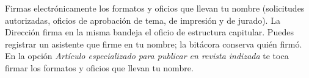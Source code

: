\documentclass[11pt,a4paper]{article}
\begin{document}
{\small\tableofcontents}
\newpage
\begin{quevasahacer}
Firmas electrónicamente los formatos y oficios que llevan tu nombre (solicitudes autorizadas, oficios de aprobación de tema, de impresión y de jurado). La Dirección firma en la misma bandeja el oficio de estructura capitular. Puedes registrar un asistente que firme en tu nombre; la bitácora conserva quién firmó. En la opción \emph{Artículo especializado para publicar en revista indizada} te toca firmar los formatos y oficios que llevan tu nombre.
\end{quevasahacer}



\end{document}
